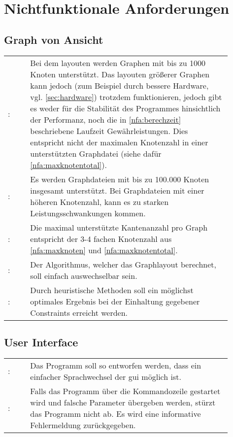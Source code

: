\chapter{Nichtfunktionale Anforderungen}
\label{ch:nfa}

\setcounter{nfanr}{10}
\newcommand{\nfano}{\ifnum\value{nfanr}<10 00\else\ifnum\value{nfanr}<100 0\fi\fi\arabic{nfanr}}
\newcommand\nfa[2]{\namedlabel{nfa:#1}{/NFA\nfano/}\addtocounter{nfanr}{10}: & #2 \\ [1ex] }

\section{Graph von Ansicht}

\begin{tabular}{lp{0.9\linewidth}}
  \nfa{maxknoten}{Bei dem layouten werden Graphen mit bis zu 1000 Knoten unterstützt. Das layouten größerer Graphen kann jedoch (zum Beispiel durch bessere Hardware, vgl. \autoref{sec:hardware}) trotzdem funktionieren, jedoch gibt es weder für die Stabilität des Programmes hinsichtlich der Performanz, noch die in \ref{nfa:berechzeit} beschriebene Laufzeit Gewährleistungen. Dies entspricht nicht der maximalen Knotenzahl in einer unterstützten Graphdatei (siehe dafür \ref{nfa:maxknotentotal}).}
  \nfa{maxknotentotal}{Es werden Graphdateien mit bis zu 100.000 Knoten insgesamt unterstützt. Bei Graphdateien mit einer höheren Knotenzahl, kann es zu starken Leistungsschwankungen kommen.}
  \nfa{maxkanten}{Die maximal unterstützte Kantenanzahl pro Graph entspricht der 3-4 fachen Knotenzahl aus \ref{nfa:maxknoten} und \ref{nfa:maxknotentotal}.}

  \nfa{algowechsel}{Der Algorithmus, welcher das Graphlayout berechnet, soll einfach auswechselbar sein.}
  \nfa{heuristic}{Durch heuristische Methoden soll ein möglichst optimales Ergebnis bei der Einhaltung gegebener Constraints erreicht werden.}
\end{tabular}

\section{User Interface}\label{sec:nfaui}
\setcounter{nfanr}{100}
\begin{tabular}{lp{0.9\linewidth}}
  \nfa{sprachwechsel}{Das Programm soll so entworfen werden, dass ein einfacher Sprachwechsel der \gls{gui} möglich ist.}
  \nfa{cmdfehler}{Falls das Programm über die Kommandozeile gestartet wird und falsche Parameter übergeben werden, stürzt das Programm nicht ab. Es wird eine informative Fehlermeldung zurückgegeben.}
\end{tabular}

